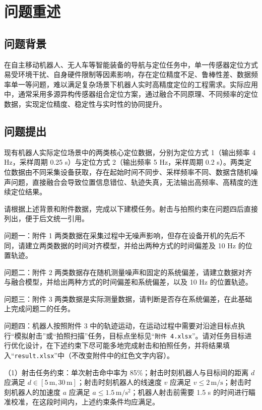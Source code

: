 \vspace*{-20pt}
\section{问题重述}

\subsection{问题背景}

在自主移动机器人、无人车等智能装备的导航与定位任务中，单一传感器定位方式易受环境干扰、自身硬件限制等因素影响，存在定位精度不足、鲁棒性差、数据频率单一等问题，难以满足复杂场景下机器人实时高精度定位的工程需求。实际应用中，通常采用多源异构传感器组合定位方案，通过融合不同原理、不同频率的定位数据，实现定位精度、稳定性与实时性的协同提升。

\subsection{问题提出}

现有机器人实际定位场景中的两类核心定位数据，分别为定位方式 1（输出频率 4 Hz，采样周期 0.25 s）与定位方式 2（输出频率 5 Hz，采样周期 0.2 s）。两类定位数据由不同采集设备获取，存在起始时间不同步、采样频率不同、数据含随机噪声问题，直接融合会导致位置信息错位、轨迹失真，无法输出高频率、高精度的连续定位结果。

请根据上述背景和附件数据，完成以下建模任务。射击与拍照约束在问题四后直接列出，便于后文统一引用。

{\heiti 问题一：}附件 1 两类数据在采集过程中无噪声影响，但存在设备开机的先后不同，请建立两类数据的时间对齐模型，并给出两种方式的时间偏差及 10 Hz 的位置轨迹。

{\heiti 问题二：}附件 2 两类数据存在随机测量噪声和固定的系统偏差，请建立数据对齐与融合模型，并给出两种方式的时间偏差和系统偏差，以及 10 Hz 的位置轨迹。

{\heiti 问题三：}附件 3 两类数据是实际测量数据，请判断是否存在系统偏差，在此基础上完成问题二的任务。

{\heiti 问题四：}机器人按照附件 3 中的轨迹运动，在运动过程中需要对沿途目标点执行“模拟射击”或“拍照扫描”任务，目标点坐标见“\texttt{附件 4.xlsx}”。请对任务目标进行优化设计，在下述约束下尽可能多地完成射击和拍照任务，并将结果填入“\texttt{result.xlsx}”中（不改变附件中的红色文字内容）。

{\heiti （1）射击任务约束：}单次射击命中率为 85\%；射击时刻机器人与目标间的距离 $d$ 应满足 $d\in[5\,\mathrm{m},30\,\mathrm{m}]$；射击时刻机器人的线速度 $v$ 应满足 $v\leq 2\,\mathrm{m/s}$；射击时刻机器人的加速度 $a$ 应满足 $a\leq 1.5\,\mathrm{m/s^2}$；机器人射击前需要 1.5 s 的时间进行瞄准校准，在这段时间内，上述约束条件均应满足。

